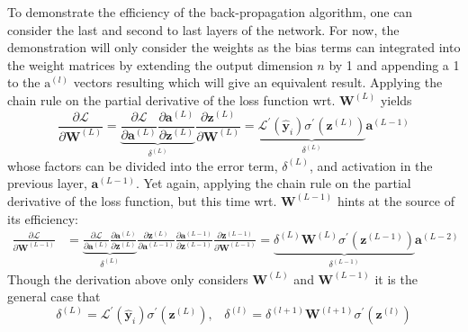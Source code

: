 \documentclass[a4paper,11pt]{article} %
\begin{document}
To demonstrate the efficiency of the back-propagation algorithm, one can consider the last and second to last layers of the network. For now, the demonstration will only consider the weights as the bias terms can integrated into the weight matrices by extending the output dimension $n$ by 1 and appending a 1 to the $\mathrm{a}^{(l)}$ vectors resulting which will give an equivalent result. Applying the chain rule on the partial derivative of the loss function wrt. $\mathbf{W}^{(L)}$ yields
\begin{equation} \label{eq:dLdW1}
  \frac{\partial \mathcal{L}}{\partial \mathbf{W}^{(L)}}  
= \underbrace{
    \frac{\partial \mathcal{L}}{\partial \mathbf{a}^{(L)}}
    \frac{\partial \mathbf{a}^{(L)}}{\partial \mathbf{z}^{(L)}}
  }_ {\delta^{(L)}}
  \frac{\partial \mathbf{z}^{(L)}}{\partial \mathbf{W}^{(L)}}
= \underbrace{
    \mathcal{L}^\prime (\hat{\mathbf{y}}_i) \sigma^\prime(\mathbf{z}^{(L)})
  }_{\delta^{(L)}}
 \mathbf{a}^{(L-1)}
\end{equation}
whose factors can be divided into the error term, $\delta^{(L)}$, and activation in the previous layer, $\mathbf{a}^{(L-1)}$. Yet again, applying the chain rule on the partial derivative of the loss function, but this time wrt. $\mathbf{W}^{(L-1)}$ hints at the source of its efficiency:
\begin{equation}
\begin{split}
    \frac{\partial \mathcal{L}}{\partial \mathbf{W}^{(L-1)}}
 &= \underbrace{
   \frac{\partial \mathcal{L}}{\partial \mathbf{a}^{(L)}}
   \frac{\partial \mathbf{a}^{(L)}}{\partial \mathbf{z}^{(L)}}
 }_{\delta^{(L)}}
   \frac{\partial \mathbf{z}^{(L)}}{\partial \mathbf{a}^{(L-1)}}
   \frac{\partial \mathbf{a}^{(L-1)}}{\partial \mathbf{z}^{(L-1)}}
   \frac{\partial \mathbf{z}^{(L-1)}}{\partial \mathbf{W}^{(L-1)}}
  = \underbrace{
    \delta^{(L)}
    \mathbf{W}^{(L)}
    \sigma^\prime(\mathbf{z}^{(L-1)})
  }_{\delta^{(L-1)}}
  \mathbf{a}^{(L-2)}
\end{split}
\end{equation}
Though the derivation above only considers $\mathbf{W}^{(L)}$ and $\mathbf{W}^{(L-1)}$ it is the general case that
\begin{equation} \label{eq:delta-terms}
  \delta^{(L)} = \mathcal{L}^\prime (\hat{\mathbf{y}}_i) \sigma^\prime(\mathbf{z}^{(L)}), 
  \hspace{10pt}
  \delta^{(l)} =  \delta^{(l+1)}\mathbf{W}^{(l+1)}\sigma^\prime(\mathbf{z}^{(l)})
\end{equation}
\end{document}
